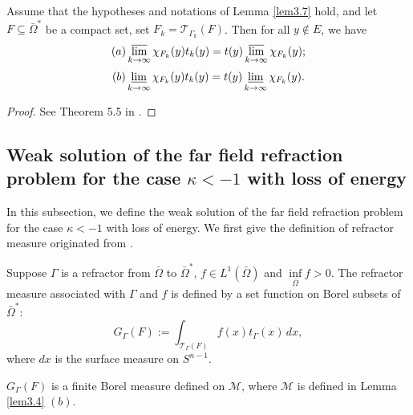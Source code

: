 \documentclass[a4paper,12pt,]{article}
\newtheorem{theorem}{\hskip\parindent\bf Theorem}[section]%
\newtheorem{remark}{\hskip\parindent\bf Remark}[section]%
\newtheorem{definition}{\hskip\parindent\bf Definition}[section]%
\numberwithin{equation}{section}
\numberwithin{equation}{section} \allowdisplaybreaks
\begin{document}
\begin{theorem}
  Assume that the hypotheses and notations of Lemma \ref{lem3.7} hold, and let $F \subseteq \bar{\Omega}^{\ast}$ be a compact set, set $F_{k} = \mathcal{T}_{\Gamma_{k}}(F)$. Then for all $y \notin E$, we have
  \begin{equation}\label{3.6}
    (a) \varlimsup_{k \rightarrow \infty} \chi_{F_{k}}(y)t_{k}(y) = t(y)\varlimsup_{k \rightarrow \infty} \chi_{F_{k}}(y);
  \end{equation}
  \begin{equation}\label{3.7}
    (b) \varliminf_{k \rightarrow \infty} \chi_{F_{k}}(y)t_{k}(y) = t(y)\varliminf_{k \rightarrow \infty} \chi_{F_{k}}(y).
  \end{equation}
  \label{thm3.1}
\end{theorem}

\begin{proof}
  See Theorem 5.5 in \cite{GM13}.
\end{proof}

\subsection{Weak solution of the far field refraction problem for the case $\kappa <-1$ with loss of energy}
In this subsection, we define the weak solution of the far field refraction problem for the case $\kappa <-1$ with loss of energy. We first give the definition of refractor measure originated from \cite{GM13}.

\begin{definition}
  Suppose $\Gamma$ is a refractor from $\bar{\Omega}$ to $\bar{\Omega}^{\ast}$, $f \in L^{1}(\bar{\Omega})$ and $\inf\limits_{\bar{\Omega}}f >0$. The refractor measure associated with $\Gamma$ and $f$ is defined by a set function on Borel subsets of $\bar{\Omega}^{\ast}$:
  \begin{equation}\label{3.8}
    G_{\Gamma}(F) := \int_{\mathcal{T}_{\Gamma}(F)}f(x)t_{\Gamma}(x) \, dx,
  \end{equation}
  where $dx$ is the surface measure on $S^{n-1}$.
  \label{def3.3}
\end{definition}

\begin{remark}
  $G_{\Gamma}(F)$ is a finite Borel measure defined on $\mathcal{M}$, where $\mathcal{M}$ is defined in Lemma \ref{lem3.4} $(b)$.
  \label{rem3.3}
\end{remark}
\end{document}
